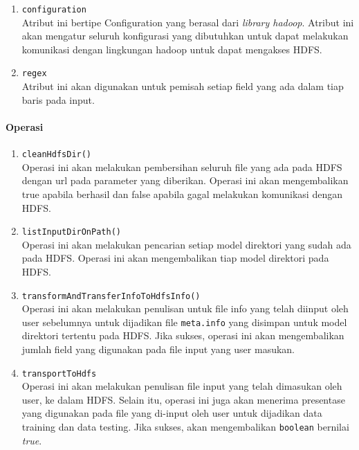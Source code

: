 \begin{enumerate}
\begin{enumerate}
			\item \verb|configuration|\\
			Atribut ini bertipe Configuration yang berasal dari \textit{library hadoop}. Atribut ini akan mengatur seluruh konfigurasi yang dibutuhkan untuk dapat melakukan komunikasi dengan lingkungan hadoop untuk dapat mengakses HDFS.

			\item \verb|regex|\\
			Atribut ini akan digunakan untuk pemisah setiap field yang ada dalam tiap baris pada input.
			
		\end{enumerate}				

	\paragraph{Operasi}
		\begin{enumerate}
			\item \texttt{cleanHdfsDir()}\\
			Operasi ini akan melakukan pembersihan seluruh file yang ada pada HDFS dengan url pada parameter yang diberikan. Operasi ini akan mengembalikan true apabila berhasil dan false apabila gagal melakukan komunikasi dengan HDFS.
			
			\item \texttt{listInputDirOnPath()}\\
			Operasi ini akan melakukan pencarian setiap model direktori yang sudah ada pada HDFS. Operasi ini akan mengembalikan tiap model direktori pada HDFS.
			
			\item \texttt{transformAndTransferInfoToHdfsInfo()}\\
			Operasi ini akan melakukan penulisan untuk file info yang telah diinput oleh user sebelumnya untuk dijadikan file \texttt{meta.info} yang disimpan untuk model direktori tertentu pada HDFS. Jika sukses, operasi ini akan mengembalikan jumlah field yang digunakan pada file input yang user masukan.
			
			\item \texttt{transportToHdfs}\\
			Operasi ini akan melakukan penulisan file input yang telah dimasukan oleh user, ke dalam HDFS. Selain itu, operasi ini juga akan menerima presentase yang digunakan pada file yang di-input oleh user untuk dijadikan data training dan data testing. Jika sukses, akan mengembalikan \texttt{boolean} bernilai \textit{true}.
			

\end{enumerate}
\end{enumerate}
